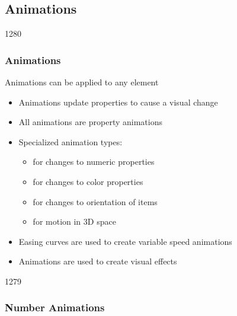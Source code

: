%
%
%
%

\subsection{Animations}
\begin{slide}{1280}\frametitle{Animations}

Animations can be applied to any element

\begin{itemize}
\item Animations update properties to cause a visual change
\item All animations are property animations
\item Specialized animation types:
  \begin{itemize}
  \item {} for changes to numeric properties
  \item {} for changes to color properties
  \item {} for changes to orientation of items
  \item {} for motion in 3D space
  \end{itemize}
\item Easing curves are used to create variable speed animations
\item Animations are used to create visual effects
\end{itemize}

\end{slide}


\begin{slide}{1279}\frametitle{Number Animations}

                                   
\end{slide}

